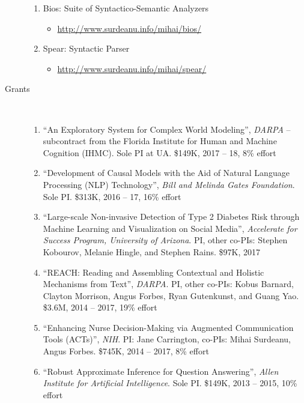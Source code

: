 \documentclass[10pt]{article}
\newcommand{\ve}[1]{{\em #1}} %
\newcommand{\ti}[1]{``#1''} %
\begin{document}
\begin{description}
\begin{enumerate}
\item Bios: Suite of Syntactico-Semantic Analyzers
\begin{itemize}
\item \url{http://www.surdeanu.info/mihai/bios/ }
\end{itemize}

\item Spear: Syntactic Parser
\begin{itemize}
\item \url{http://www.surdeanu.info/mihai/spear/ }
\end{itemize}

\end{enumerate}


\item [Grants]\
\begin{enumerate}

\item \ti{An Exploratory System for Complex World Modeling}, \ve{DARPA} -- subcontract from the Florida Institute for Human and Machine Cognition (IHMC). Sole PI at UA. \$149K, 2017 -- 18, 8\% effort

\item \ti{Development of Causal Models with the Aid of Natural Language Processing (NLP) Technology}, \ve{Bill and Melinda Gates Foundation}. Sole PI. \$313K, 2016 -- 17, 16\% effort

\item \ti{Large-scale Non-invasive Detection of Type 2 Diabetes Risk through Machine Learning and Visualization on Social Media}, \ve{Accelerate for Success Program, University of Arizona}. PI, other co-PIs: Stephen Kobourov, Melanie Hingle, and Stephen Rains. \$97K, 2017

\item \ti{REACH: Reading and Assembling Contextual and Holistic Mechanisms from Text}, \ve{DARPA}. PI, other co-PIs: Kobus Barnard, Clayton Morrison, Angus Forbes, Ryan Gutenkunst, and Guang Yao. \$3.6M, 2014 -- 2017, 19\% effort

\item \ti{Enhancing Nurse Decision-Making via Augmented Communication Tools (ACTs)}, \ve{NIH}. PI: Jane Carrington, co-PIs: Mihai Surdeanu, Angus Forbes. \$745K, 2014 -- 2017, 8\% effort

\item \ti{Robust Approximate Inference for Question Answering}, \ve{Allen Institute for Artificial Intelligence}. Sole PI. \$149K, 2013 -- 2015, 10\% effort


\end{enumerate}
\end{description}
\end{document}
